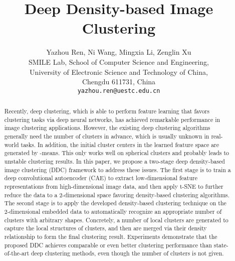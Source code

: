 \documentclass[10pt,twocolumn,letterpaper]{article}
\begin{document}
\title{Deep Density-based Image Clustering}

\author{Yazhou Ren, Ni Wang, Mingxia  Li, Zenglin Xu\\
SMILE Lab, School of Computer Science and Engineering, \\University of Electronic Science and Technology of China, \\Chengdu 611731, China\\
{\tt\small yazhou.ren@uestc.edu.cn}
}

\maketitle


\begin{abstract}
Recently, deep clustering, which is able to perform feature learning that favors clustering tasks via deep neural networks, has achieved remarkable performance in image clustering applications. However, the existing deep clustering algorithms generally need the number of clusters in advance, which is usually unknown in real-world tasks. In addition, the initial cluster centers in the learned feature space are generated by -means. This only works well on spherical clusters and probably leads to unstable clustering results. In this paper, we propose a two-stage deep density-based image clustering (DDC) framework to address these issues. The first stage is to train a deep convolutional autoencoder (CAE) to extract low-dimensional feature representations from high-dimensional image data, and then apply t-SNE to further reduce the data to a 2-dimensional space favoring density-based clustering algorithms. The second stage is to apply the developed density-based clustering technique on the 2-dimensional embedded data to automatically recognize an appropriate number of clusters with arbitrary shapes. Concretely, a number of local clusters are generated to capture the local structures of clusters, and then are merged via their density relationship to form the final clustering result. Experiments demonstrate that the proposed DDC achieves comparable or even better clustering performance than state-of-the-art deep clustering methods, even though the number of clusters is not given.
\end{abstract}
\end{document}
